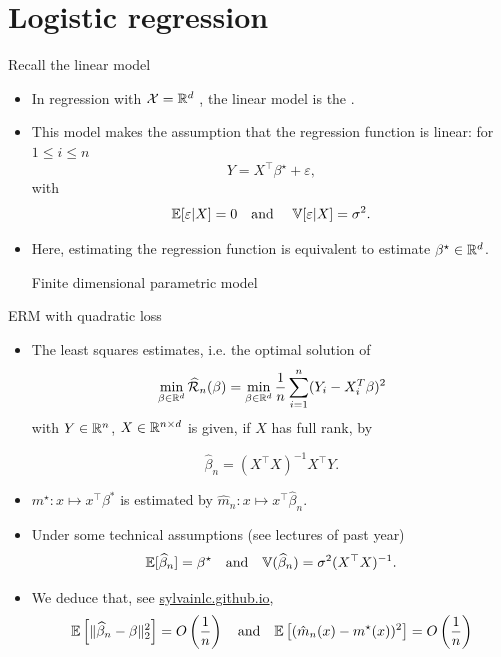 \documentclass[xcolor={usenames,dvipsnames},handout]{beamer}
\begin{document}
\section{Logistic regression}




\begin{frame}{Recall the linear model}
\begin{itemize}
\item In regression with ${\mathcal{X}} = \mathbb{R}^d$ , the linear model is the .
\pause 
\item This model makes the assumption that the regression function is linear: for $1\leq i \leq n$
$$
Y =  X^\top \beta^\star +\varepsilon,
$$
with 
$$
\mathbb{E} [ \varepsilon| X ] = 0 \quad \text{and } \quad \mathbb{V} [ \varepsilon | X] = \sigma^2.
$$
\item Here, estimating the regression function is equivalent to estimate $\beta^\star \in \mathbb{R}^d$.

\vspace{.2cm}

{\color{Vert}Finite dimensional parametric model}
\end{itemize} 
\end{frame}

\begin{frame}{ERM with quadratic loss} 


\begin{itemize}
\item The least squares estimates, i.e. the optimal solution of
$$
\min_{\beta \in \mathbb{R}^d} \widehat{{\mathcal{R}}}_n (\beta) = \min_{\beta \in \mathbb{R}^d} \frac{1}{n} \sum_{i=1}^n (Y_i - X_i^T \beta)^2
$$
with $Y\in\mathbb{R}^n$, $X\in \mathbb{R}^{n\times d}$ is given, \alert{if $X$ has full rank}, by
 
$$
\widehat{\beta}_n  = (X^\top X)^{-1} X^\top Y.
$$
\item  $m^\star: x \mapsto x^\top \beta^*$ is estimated by $\widehat{m}_n: x \mapsto  x^\top \widehat{\beta}_n$. 
\item Under some technical assumptions (see lectures of past year)
{\color{Vert}$$
\mathbb{E} [ \widehat{\beta}_n  ] = \beta^\star \quad \text{and} \quad \mathbb{V} (\widehat{\beta}_n   ) = \sigma^2 (X^\top X)^{-1} .
$$}
\item We deduce that, see \url{sylvainlc.github.io},
$$
\mathbb{E} \left[ \| \widehat{\beta}_n - \beta \|_2^2 \right] = O \left( \frac{1}{n} \right) \quad \text{and} \quad \mathbb{E} \left[ ( \hat{m}_n(x) - m^\star(x) )^2 \right] = O \left( \frac{1}{n} \right) 
$$
\end{itemize}
\end{frame}
\end{document}
